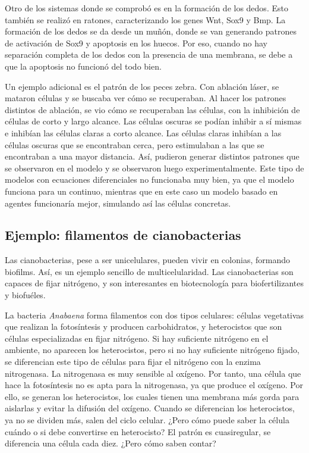 \documentclass[nochap]{config/ejercicios}
\begin{document}
Otro de los sistemas donde se comprobó es en la formación de los dedos. Esto también se realizó en ratones, caracterizando los genes Wnt, Sox9 y Bmp. La formación de los dedos se da desde un muñón, donde se van generando patrones de activación de Sox9 y apoptosis en los huecos. Por eso, cuando no hay separación completa de los dedos con la presencia de una membrana, se debe a que la apoptosis no funcionó del todo bien. 

Un ejemplo adicional es el patrón de los peces zebra. Con ablación láser, se mataron células y se buscaba ver cómo se recuperaban. Al hacer los patrones distintos de ablación, se vio cómo se recuperaban las células, con la inhibición de células de corto y largo alcance. Las células oscuras se podían inhibir a sí mismas e inhibían las células claras a corto alcance. Las células claras inhibían a las células oscuras que se encontraban cerca, pero estimulaban a las que se encontraban a una mayor distancia. Así, pudieron generar distintos patrones que se observaron en el modelo y se observaron luego experimentalmente. Este tipo de modelos con ecuaciones diferenciales no funcionaba muy bien, ya que el modelo funciona para un continuo, mientras que en este caso un modelo basado en agentes funcionaría mejor, simulando así las células concretas. 

\subsection{Ejemplo: filamentos de cianobacterias}
Las cianobacterias, pese a ser unicelulares, pueden vivir en colonias, formando biofilms. Así, es un ejemplo sencillo de multicelularidad. Las cianobacterias son capaces de fijar nitrógeno, y son interesantes en biotecnología para biofertilizantes y biofuéles. 

La bacteria \textit{Anabaena} forma filamentos con dos tipos celulares: células vegetativas que realizan la fotosíntesis y producen carbohidratos, y heterocistos que son células especializadas en fijar nitrógeno. Si hay suficiente nitrógeno en el ambiente, no aparecen los heterocistos, pero si no hay suficiente nitrógeno fijado, se diferencian este tipo de células para fijar el nitrógeno con la enzima nitrogenasa. La nitrogenasa es muy sensible al oxígeno. Por tanto, una célula que hace la fotosíntesis no es apta para la nitrogenasa, ya que produce el oxígeno. Por ello, se generan los heterocistos, los cuales tienen una membrana más gorda para aislarlas y evitar la difusión del oxígeno. Cuando se diferencian los heterocistos, ya no se dividen más, salen del ciclo celular. ¿Pero cómo puede saber la célula cuándo o si debe convertirse en heterocisto? El patrón es cuasiregular, se diferencia una célula cada diez. ¿Pero cómo saben contar? 
\end{document}

